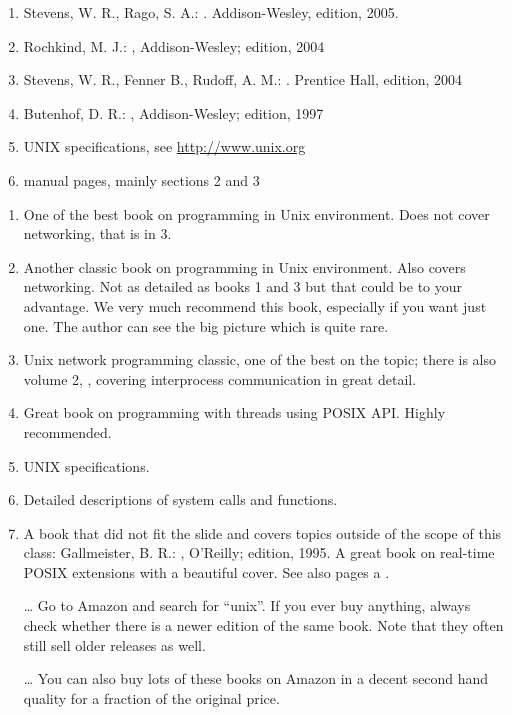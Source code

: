 
\begin{slide}
\begin{enumerate}
\item Stevens, W. R., Rago, S. A.: . Addison-Wesley,  edition, 2005.
\item Rochkind, M. J.: ,
Addison-Wesley;  edition, 2004
\item Stevens, W. R., Fenner B., Rudoff, A. M.: . Prentice Hall,
 edition, 2004
\item Butenhof, D. R.: ,
Addison-Wesley;  edition, 1997
\item UNIX specifications, see \url{http://www.unix.org}
\item manual pages, mainly sections 2 and 3
\end{enumerate}
\end{slide}

\label{REF_PROGRAMMING}

\begin{enumerate}
\item One of the best book on programming in Unix environment.  Does not cover
net\-work\-ing, that is in 3.
\item Another classic book on programming in Unix environment.  Also covers
net\-work\-ing.  Not as detailed as books 1 and 3 but that could be to your
advantage.  We very much recommend this book, especially if you want just one.
The author can see the big picture which is quite rare.
\item Unix network programming classic, one of the best on the topic; there is
also volume 2, , covering interprocess communication in great detail.
\item Great book on programming with threads using POSIX API.  Highly
recommended.
\item UNIX specifications.
\item Detailed descriptions of system calls and functions.
\item \label{POSIX4} A book that did not fit the slide and covers topics outside
of the scope of this class: Gall\-meis\-ter, B. R.: , O'Reilly;  edition, 1995.  A great
book on real-time POSIX extensions with a beautiful cover.  See also pages
\pageref{REALTIMEEXTENSIONS} a \pageref{SIGWAITINFO}.
\item[\ldots] Go to Amazon and search for ``unix''.  If you ever buy anything,
always check whether there is a newer edition of the same book.  Note that they
often still sell older releases as well.
\item[\ldots] You can also buy lots of these books on Amazon in a decent second
hand quality for a fraction of the original price.
\end{enumerate}

